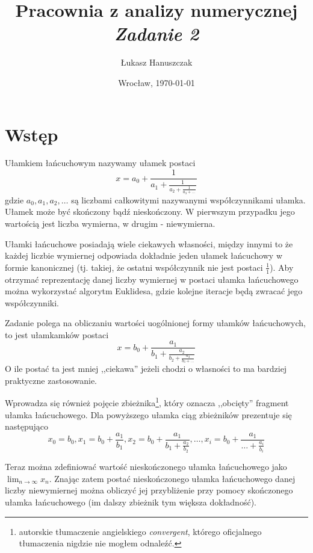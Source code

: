 \documentclass[11pt,leqno]{article}
\title{
  \textbf{Pracownia z analizy numerycznej}\\
  \textit{Zadanie 2}
}
\author{Łukasz Hanuszczak}
\date{Wrocław, \today}
\begin{document}
\maketitle



\section{Wstęp}


Ułamkiem łańcuchowym nazywamy ułamek postaci
\[
x =
  a_0 + \frac{1}{\displaystyle
    a_1 + \frac{1}{\displaystyle
      a_2 + \frac{1}{\displaystyle
        a_3 + \dots
      }
    }
  }
\]
gdzie $a_0, a_1, a_2, \dots$ są liczbami całkowitymi nazywanymi współczynnikami ułamka. Ułamek może być skończony bądź nieskończony. W pierwszym przypadku jego wartością jest liczba wymierna, w drugim - niewymierna.

Ułamki łańcuchowe posiadają wiele ciekawych własności, między innymi to że każdej liczbie wymiernej odpowiada dokładnie jeden ułamek łańcuchowy w formie kanonicznej (tj. takiej, że ostatni współczynnik nie jest postaci $\frac{1}{1}$). Aby otrzymać reprezentację danej liczby wymiernej w postaci ułamka łańcuchowego można wykorzystać algorytm Euklidesa, gdzie kolejne iteracje będą zwracać jego współczynniki.

Zadanie polega na obliczaniu wartości uogólnionej formy ułamków łańcuchowych, to jest ułamkamków postaci
\[
x =
  b_0 + \frac{a_1}{\displaystyle
    b_1 + \frac{a_2}{\displaystyle
      b_2 + \frac{a_3}{\displaystyle
        b_3 + \dots
      }
    }
  }
\]
O ile postać ta jest mniej ,,ciekawa'' jeżeli chodzi o własności to ma bardziej praktyczne zastosowanie.

Wprowadza się również pojęcie zbieżnika\footnote{autorskie tłumaczenie angielskiego \emph{convergent}, którego oficjalnego tłumaczenia nigdzie nie mogłem odnaleźć.}, który oznacza ,,obcięty'' fragment ułamka łańcuchowego. Dla powyższego ułamka ciąg zbieżników prezentuje się następująco
\[
  x_0 = b_0,
  x_1 = b_0 + \frac{a_1}{\displaystyle
    b_1
  },
  x_2 = b_0 + \frac{a_1}{\displaystyle
    b_1 + \frac{a_2}{\displaystyle
      b_2
    }
  },
  \dots,
  x_i = b_0 + \frac{a_1}{\displaystyle
    \dots + \frac{a_i}{\displaystyle
      b_i
    }
  }
\]

Teraz można zdefiniować wartość nieskończonego ułamka łańcuchowego jako $\lim_{n\to\infty}x_n$. Znając zatem postać nieskończonego ułamka łańcuchowego danej liczby niewymiernej można obliczyć jej przybliżenie przy pomocy skończonego ułamka łańcuchowego (im dalszy zbieżnik tym większa dokładność).
\end{document}
